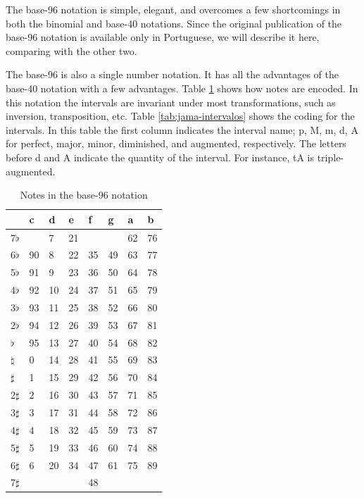 \documentclass{article}
\begin{document}
The base-96 notation is simple, elegant, and overcomes a few
shortcomings in both the binomial and base-40 notations. Since the
original publication of the base-96 notation is available only in
Portuguese, we will describe it here, comparing with the other
two.

The base-96 is also a single number notation. It has all the
advantages of the base-40 notation with a few advantages. Table
\ref{tab:jama-notas} shows how notes are encoded. In this notation the
intervals are invariant under most transformations, such as inversion,
transposition, etc. Table \ref{tab:jama-intervalos} shows the coding
for the intervals. In this table the first column indicates the
interval name; p, M, m, d, A for perfect, major, minor, diminished,
and augmented, respectively. The letters before d and A indicate the
quantity of the interval. For instance, tA is triple-augmented.

\begin{table}
  \centering
  \begin{tabular}{l|lllllll}
               & c & d& e& f& g& a& b \\
    \hline
    7$\flat$   &   & 7&21&  &  &62&76 \\
    6$\flat$   & 90& 8&22&35&49&63&77 \\
    5$\flat$   & 91& 9&23&36&50&64&78 \\
    4$\flat$   & 92&10&24&37&51&65&79 \\
    3$\flat$   & 93&11&25&38&52&66&80 \\
    2$\flat$   & 94&12&26&39&53&67&81 \\
    $\flat$    & 95&13&27&40&54&68&82 \\
    $\natural$ &  0&14&28&41&55&69&83 \\
    $\sharp$   &  1&15&29&42&56&70&84 \\
    2$\sharp$  &  2&16&30&43&57&71&85 \\
    3$\sharp$  &  3&17&31&44&58&72&86 \\
    4$\sharp$  &  4&18&32&45&59&73&87 \\
    5$\sharp$  &  5&19&33&46&60&74&88 \\
    6$\sharp$  &  6&20&34&47&61&75&89 \\
    7$\sharp$  &   &  &  &48&  &  &   \\
  \end{tabular}
  \caption{Notes in the base-96 notation}
  \label{tab:jama-notas}
\end{table}
\end{document}

